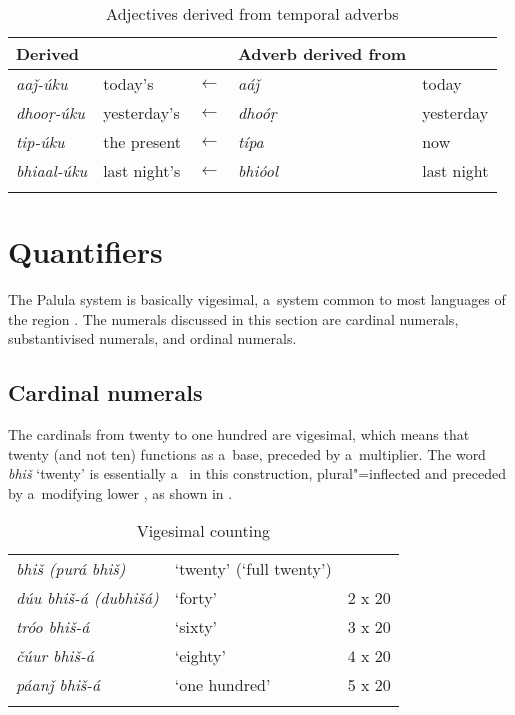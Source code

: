 \begin{table}[ht]
\caption{Adjectives derived from temporal adverbs}

\begin{tabularx}{\textwidth}{ Q l l Q l }
\lsptoprule
Derived  &
&
&
Adverb derived from &
\\\hline
\textit{aaǰ-úku} &
today's &
$\leftarrow$ &
\textit{aáǰ} &
today\\
\textit{dhooṛ-úku} &
yesterday's &
$\leftarrow$ &
\textit{dhoóṛ} &
yesterday\\
\textit{tip-úku} &
the present &
$\leftarrow$ &
\textit{típa} &
now\\
\textit{bhiaal-úku} &
last night's &
$\leftarrow$ &
\textit{bhióol} &
last night\\\lspbottomrule
\end{tabularx}
\label{tab:6-6}
\end{table}


\section{Quantifiers}
\label{sec:6-4}

The Palula  system is basically vigesimal, a~system common to most languages of the region \citep[823]{bashir2003}. The numerals discussed in this section are cardinal numerals, substantivised numerals, and ordinal numerals.


\subsection{Cardinal numerals}
\label{subsec:6-4-1}

The cardinals from twenty to one hundred are vigesimal, which means that twenty (and not ten) functions as a~base, preceded by a~multiplier. The word \textit{bhiš} `twenty' is essentially a~ in this construction, plural"=inflected and preceded by a~modifying lower , as shown in . 


\begin{table}
\caption{Vigesimal counting}
\begin{tabularx}{\textwidth}{ Q Q l@{\hspace{50pt}} }
\lsptoprule
\textit{bhiš (purá bhiš)} &
`twenty' (`full twenty') &
\\
\textit{dúu bhiš-á (dubhišá)} &
`forty' &
2 x 20\\
\textit{tróo bhiš-á} &
`sixty' &
3 x 20\\
\textit{čúur bhiš-á} &
`eighty' &
4 x 20\\
\textit{páanǰ bhiš-á} &
`one hundred' &
5 x 20\\\lspbottomrule
\end{tabularx}
\label{tab:6-vig}
\end{table}


